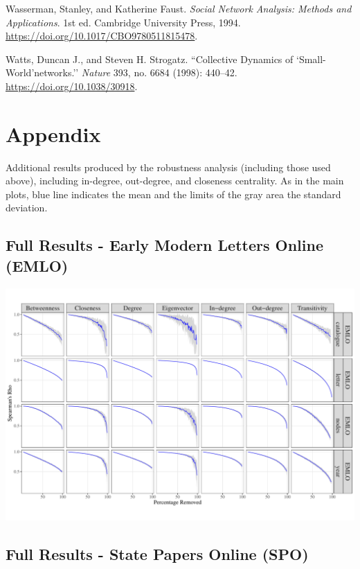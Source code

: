 \documentclass[]{article}
\begin{document}
\leavevmode\hypertarget{ref-wasserman_social_1994}{}%
Wasserman, Stanley, and Katherine Faust. \emph{Social Network Analysis: Methods and Applications}. 1st ed. Cambridge University Press, 1994. \url{https://doi.org/10.1017/CBO9780511815478}.

\leavevmode\hypertarget{ref-strogatz_collective_1998}{}%
Watts, Duncan J., and Steven H. Strogatz. ``Collective Dynamics of `Small-World'networks.'' \emph{Nature} 393, no. 6684 (1998): 440--42. \url{https://doi.org/10.1038/30918}.

\newpage

\hypertarget{appendix}{%
\section*{Appendix}\label{appendix}}

Additional results produced by the robustness analysis (including those used above), including in-degree, out-degree, and closeness centrality. As in the main plots, blue line indicates the mean and the limits of the gray area the standard deviation.

\hypertarget{full-results---early-modern-letters-online-emlo}{%
\subsection{Full Results - Early Modern Letters Online (EMLO)}\label{full-results---early-modern-letters-online-emlo}}

\includegraphics{network_robustness_article_anon_files/figure-latex/unnamed-chunk-15-1.pdf}
\newpage   

\hypertarget{full-results---state-papers-online-spo}{%
\subsection{Full Results - State Papers Online (SPO)}\label{full-results---state-papers-online-spo}}
\end{document}
